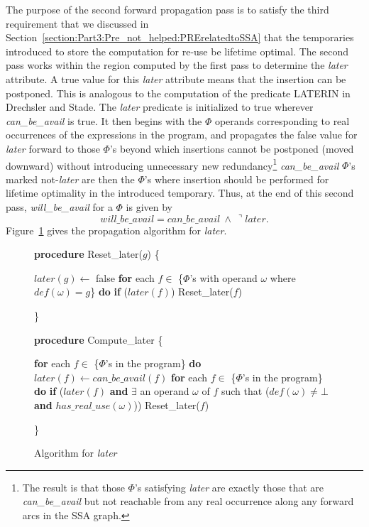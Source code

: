 The purpose of the second forward propagation pass is to 
satisfy the third requirement that we discussed in 
Section~\ref{section:Part3:Pre_not_helped:PRErelatedtoSSA}
that the temporaries introduced to store the computation for re-use be 
lifetime optimal. The second pass works within the region computed by the
first pass to determine the \emph{later} attribute. 
A true value for this \emph{later} attribute means that the insertion
can be postponed.  This
is analogous to the computation of the predicate LATERIN
in Drechsler and Stade\cite{DS93}.  The \emph{later}
predicate is initialized to true wherever \emph{can\_be\_avail} is
true.  It then begins with the $\Phi$ operands corresponding to real
occurrences of the expressions in the program, and propagates the false value
for \emph{later} forward to those $\Phi$'s beyond which insertions cannot be
postponed (moved downward) without introducing unnecessary new 
redundancy\footnote{The result is that those $\Phi$'s satisfying \emph{later}
are exactly those that are \emph{can\_be\_avail} but not reachable from
any real occurrence along any forward arcs in the SSA graph.}
\emph{can\_be\_avail} $\Phi$'s marked not-\emph{later} are then the $\Phi$'s
where insertion should be performed for lifetime optimality in the introduced
temporary.   Thus, at the end of this second pass, \emph{will\_be\_avail}
for a $\Phi$ is given by $$will\_be\_avail = can\_be\_avail\ \wedge\ \urcorner later.$$
Figure~\ref{fig: later} gives the propagation algorithm for \emph{later}.

\begin{figure}[!ht]
{\bf procedure} Reset\_later($g$) 
\{
\begin{code}
 $later(g) \leftarrow$ false
 {\bf for} each $f \in$ \{$\Phi$'s with operand $\omega$ where $def(\omega) = g$\} {\bf do}
   {\bf if} ($later(f)$)
       Reset\_later($f$)
\end{code}
\}

{\bf procedure} Compute\_later
\{
\begin{code}
 {\bf for} each $f \in$ \{$\Phi$'s in the program\} {\bf do}
   $later(f) \leftarrow can\_be\_avail(f)$
 {\bf for} each $f \in$ \{$\Phi$'s in the program\} {\bf do}
   {\bf if} ($later(f)$ {\bf and}
       $\exists$ an operand $\omega$ of $f$ such that ($def(\omega) \neq \bot$ {\bf and} $has\_real\_use(\omega)$))
	Reset\_later($f$)
\end{code}
\}
\caption{Algorithm for \emph{later}}
\label{fig: later}
\end{figure}

